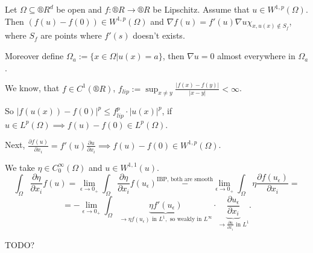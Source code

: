 \documentclass[12pt]{article}					%
\begin{document}
\begin{veta}
	Let $\Omega \subseteq ®R^d$ be open and $f: ®R \rightarrow ®R$ be Lipschitz. Assume that $u \in W^{1, p}(\Omega)$. Then $(f(u) - f(0)) \in W^{1, p}(\Omega)$ and $\nabla f(u) = f'(u) \nabla u \chi_{x, u(x) \notin S_f}$, where $S_f$ are points where $f'(s)$ doesn't exists.

	Moreover define $\Omega_a := \{x \in \Omega | u(x) = a\}$, then $\nabla u = 0$ almost everywhere in $\Omega_a$.

	\begin{dukazin}
		We know, that $f \in C^1(®R)$, $f_{lip} := \sup_{x ≠ y} \frac{|f(x) - f(y)|}{|x - y|} < ∞$.

		So $|f(u(x)) - f(0)|^p ≤ f_{lip}^p·|u(x)|^p$, if $u \in L^p(\Omega) \implies f(u) - f(0) \in L^p(\Omega)$.

		Next, $\frac{\partial f(u)}{\partial x_i} = f'(u) \frac{\partial u}{\partial x_i} \implies f(u) - f(0) \in W^{1, p}(\Omega)$.

		We take $\eta \in C_0^∞(\Omega)$ and $u \in W^{1, 1}(u)$.
		$$ \int_\Omega \frac{\partial \eta}{\partial x_i} f(u) = \lim_{\epsilon \rightarrow 0_+} \int_\Omega \frac{\partial \eta}{\partial x_i} f(u_\epsilon) \overset{\text{IBP, both are smooth}} -\lim_{\epsilon \rightarrow 0_+} \int_\Omega \eta \frac{\partial f(u_\epsilon)}{\partial x_i} = $$
		$$ = -\lim_{\epsilon \rightarrow 0_+} \int_\Omega \underbrace{\eta f'(u_\epsilon)}_{\rightarrow \eta f(u_\epsilon) \text{ in } L^1, \text{ so weakly in } L^∞} · \underbrace{\frac{\partial u_\epsilon}{\partial x_i}}_{\rightarrow \frac{\partial u}{\partial x_i} \text{ in } L^1}. $$

		TODO?
	\end{dukazin}
\end{veta}
\end{document}

